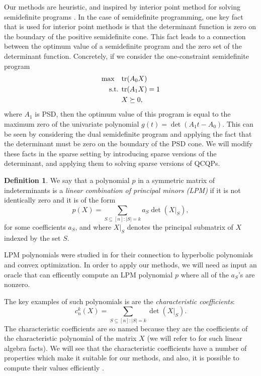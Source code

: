 \documentclass{amsart}
\theoremstyle{definition}
\newtheorem{defi}[theorem]{Definition}
\newcommand{\tr}{\textup{tr}}
\newcommand{\st}{{\text{ s.t. }}}
\begin{document}
Our methods are heuristic, and inspired by interior point method for solving semidefinite programs \cite{alizadeh1995interior, ben2001lectures}.
In the case of semidefinite programming, one key fact that is used for interior point methods is that the determinant function is zero on the boundary of the positive semidefinite cone.
This fact leads to a connection between the optimum value of a semidefinite program and the zero set of the determinant function.
Concretely, if we consider the one-constraint semidefinite program
\begin{equation}
    \begin{aligned}
        \max\quad & \tr(A_0X)\\
        \st & \tr(A_1X) = 1\\
            & X \succeq 0,
    \end{aligned}
\end{equation}
where $A_1$ is PSD, then the optimum value of this program is equal to the maximum zero of the univariate polynomial $g(t) = \det(A_1 t - A_0)$.
This can be seen by considering the dual semidefinite program and applying the fact that the determinant must be zero on the boundary of the PSD cone.
We will modify these facts in the sparse setting by introducing sparse versions of the determinant, and applying them to solving sparse versions of QCQPs.

\begin{defi}
We say that a polynomial $p$ in a symmetric matrix of indeterminants is a \emph{linear combination of principal minors (LPM)} if it is not identically zero and it is of the form
\[
    p(X) = \sum_{S \subseteq [n] : |S| = k} a_S\det(X|_S),
\]
for some coefficients $a_S$, and where $X|_S$ denotes the principal submatrix of $X$ indexed by the set $S$.
\end{defi}
LPM polynomials were studied in \cite{blekherman2021linear} for their connection to hyperbolic polynomials and convex optimization.
In order to apply our methods, we will need as input an oracle that can efficently compute an LPM polynomial $p$ where all of the $a_S$'s are nonzero.

The key examples of such polynomials is are the \emph{characteristic coefficients}:
\[
    c_n^k(X) = \sum_{S \subseteq [n] : |S| = k} \det(X|_S).
\]
The characteristic coefficients are so named because they are the coefficients of the characteristic polynomial of the matrix $X$ (we will refer to \cite{horn2012matrix} for such linear algebra facts).
We will see that the characteristic coefficients have a number of properties which make it suitable for our methods, and also, it is possible to compute their values efficiently \cite{baer2021faddeev}.
\end{document}
